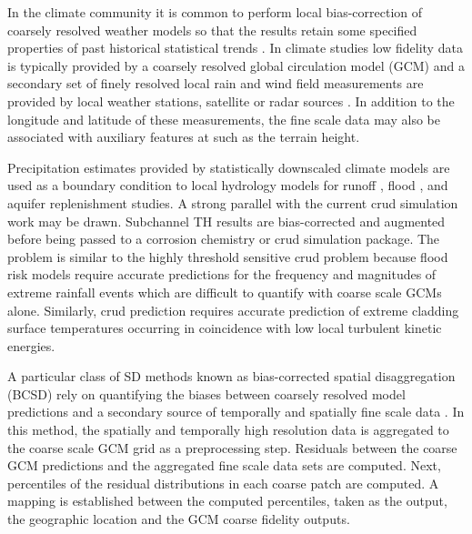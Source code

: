 In the climate community it is common to perform local bias-correction of coarsely resolved weather models so that the results retain some specified properties of past historical statistical trends \cite{wilby1998} \cite{arelia2016}.  In climate studies low fidelity data is typically provided by a coarsely resolved global circulation model (GCM) and a secondary set of finely resolved local rain and wind field measurements are provided by local weather stations, satellite or radar sources \cite{goly2014}.  In addition to the longitude and latitude of these measurements, the fine scale data may also be associated with auxiliary features at such as the terrain height.


Precipitation estimates provided by statistically downscaled climate models are used as a boundary condition to local hydrology models for runoff \cite{wood2002}, flood \cite{hess2007}, and aquifer replenishment studies.  A strong parallel with the current crud simulation work may be drawn. Subchannel TH results are bias-corrected and augmented before being passed to a corrosion chemistry or crud simulation package. The problem is similar to the highly threshold sensitive crud problem because flood risk models require accurate predictions for the frequency and magnitudes of extreme rainfall events which are difficult to quantify with coarse scale GCMs alone.  Similarly, crud prediction requires accurate prediction of extreme cladding surface temperatures occurring in coincidence with low local turbulent kinetic energies.

A particular class of SD methods known as bias-corrected spatial disaggregation (BCSD) rely on quantifying the biases between coarsely resolved model predictions and a secondary source of temporally and spatially fine scale data \cite{wood2002}.  In this method, the spatially and temporally high resolution data is aggregated to the coarse scale GCM grid as a preprocessing step.  Residuals between the coarse GCM predictions and the aggregated fine scale data sets are computed. Next, percentiles of the residual distributions in each coarse patch are computed.  A mapping is established between the computed percentiles, taken as the output, the geographic location and the GCM coarse fidelity outputs.  

